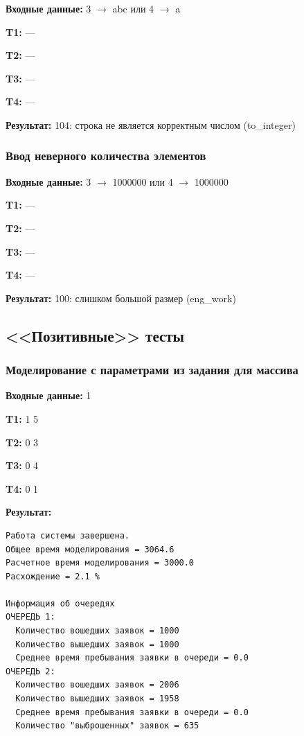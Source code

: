 \documentclass[a4paper,12pt]{extarticle}
\begin{document}
\textbf{Входные данные: }
3 $\rightarrow$ abc или 4 $\rightarrow$ a

\textbf{T1: }
---

\textbf{T2: }
---

\textbf{T3: }
---

\textbf{T4: }
---


\textbf{Результат: }
104: строка не является корректным числом (to_integer)


\subsubsection{Ввод неверного количества элементов}

\textbf{Входные данные: }
3 $\rightarrow$ 1000000 или 4 $\rightarrow$ 1000000

\textbf{T1: }
---

\textbf{T2: }
---

\textbf{T3: }
---

\textbf{T4: }
---


\textbf{Результат: }
100: слишком большой размер (eng\_work)




\subsection{<<Позитивные>> тесты}

\subsubsection{Моделирование с параметрами из задания для массива}

\textbf{Входные данные: }
1

\textbf{T1: }
1 5

\textbf{T2: }
0 3

\textbf{T3: }
0 4

\textbf{T4: }
0 1


\textbf{Результат: }

\begin{verbatim}
Работа системы завершена.
Общее время моделирования = 3064.6
Расчетное время моделирования = 3000.0
Расхождение = 2.1 %

Информация об очередях
ОЧЕРЕДЬ 1:
  Количество вошедших заявок = 1000
  Количество вышедших заявок = 1000
  Среднее время пребывания заявки в очереди = 0.0
ОЧЕРЕДЬ 2:
  Количество вошедших заявок = 2006
  Количество вышедших заявок = 1958
  Среднее время пребывания заявки в очереди = 0.0
  Количество "выброшенных" заявок = 635
\end{verbatim}
\end{document}
